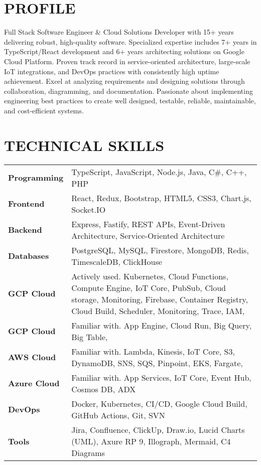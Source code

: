 \documentclass{fullstackdeveloper-ats}
\begin{document}

\vspace{0.3cm}

\section{PROFILE}
\justify
Full Stack Software Engineer \& Cloud Solutions Developer with 15+ years delivering robust, high-quality software. Specialized expertise includes 7+ years in TypeScript/React development and 6+ years architecting solutions on Google Cloud Platform. Proven track record in service-oriented architecture, large-scale IoT integrations, and DevOps practices with consistently high uptime achievement. Excel at analyzing requirements and designing solutions through collaboration, diagramming, and documentation. Passionate about implementing engineering best practices to create well designed, testable, reliable, maintainable, and cost-efficient systems.

\section{TECHNICAL SKILLS}

\begin{tabular}{p{2.5cm}p{14cm}}
\textbf{Programming} & TypeScript, JavaScript, Node.js, Java, C\#, C++, PHP \\[0.2cm]
\textbf{Frontend} & React, Redux, Bootstrap, HTML5, CSS3, Chart.js, Socket.IO \\[0.2cm]
\textbf{Backend} & Express, Fastify, REST APIs, Event-Driven Architecture, Service-Oriented Architecture \\[0.2cm]
\textbf{Databases} & PostgreSQL, MySQL, Firestore, MongoDB, Redis, TimescaleDB, ClickHouse \\[0.2cm]
\textbf{GCP Cloud} & Actively used. Kubernetes, Cloud Functions, Compute Engine, IoT Core, PubSub, Cloud storage, Monitoring, Firebase, Container Registry, Cloud Build, Scheduler, Monitoring, Trace, IAM, \\[0.2cm]
\textbf{GCP Cloud} & Familiar with. App Engine, Cloud Run, Big Query, Big Table, \\[0.2cm]
\textbf{AWS Cloud} & Familiar with. Lambda, Kinesis, IoT Core, S3, DynamoDB, SNS, SQS, Pinpoint, EKS, Fargate,    \\[0.2cm]
\textbf{Azure Cloud} & Familiar with. App Services, IoT Core, Event Hub, Cosmos DB, ADX \\[0.2cm]
\textbf{DevOps} & Docker, Kubernetes, CI/CD, Google Cloud Build, GitHub Actions, Git, SVN \\[0.2cm]
\textbf{Tools} & Jira, Confluence, ClickUp, Draw.io, Lucid Charts (UML), Axure RP 9, Illograph, Mermaid, C4 Diagrams \\
\end{tabular}
\end{document}
